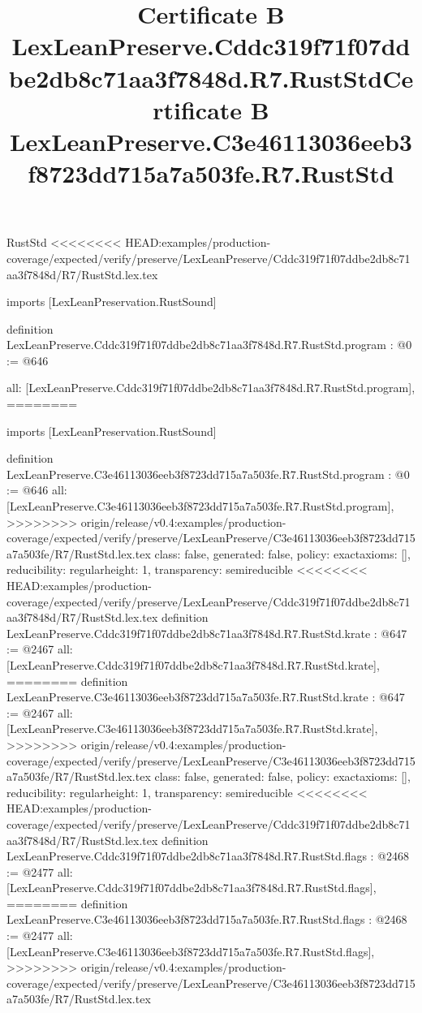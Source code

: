 \begin{lexlean}{RustStd}
<<<<<<<< HEAD:examples/production-coverage/expected/verify/preserve/LexLeanPreserve/Cddc319f71f07ddbe2db8c71aa3f7848d/R7/RustStd.lex.tex
\title{Certificate B LexLeanPreserve.Cddc319f71f07ddbe2db8c71aa3f7848d.R7.RustStd}
\begin{coremodule}
imports [LexLeanPreservation.RustSound]

definition LexLeanPreserve.Cddc319f71f07ddbe2db8c71aa3f7848d.R7.RustStd.program : @0 := @646 {
  all: [LexLeanPreserve.Cddc319f71f07ddbe2db8c71aa3f7848d.R7.RustStd.program],
========
\title{Certificate B LexLeanPreserve.C3e46113036eeb3f8723dd715a7a503fe.R7.RustStd}
\begin{coremodule}
imports [LexLeanPreservation.RustSound]

definition LexLeanPreserve.C3e46113036eeb3f8723dd715a7a503fe.R7.RustStd.program : @0 := @646 {
  all: [LexLeanPreserve.C3e46113036eeb3f8723dd715a7a503fe.R7.RustStd.program],
>>>>>>>> origin/release/v0.4:examples/production-coverage/expected/verify/preserve/LexLeanPreserve/C3e46113036eeb3f8723dd715a7a503fe/R7/RustStd.lex.tex
  class: false,
  generated: false,
  policy: exact{axioms: []},
  reducibility: regular{height: 1},
  transparency: semireducible
}
<<<<<<<< HEAD:examples/production-coverage/expected/verify/preserve/LexLeanPreserve/Cddc319f71f07ddbe2db8c71aa3f7848d/R7/RustStd.lex.tex
definition LexLeanPreserve.Cddc319f71f07ddbe2db8c71aa3f7848d.R7.RustStd.krate : @647 := @2467 {
  all: [LexLeanPreserve.Cddc319f71f07ddbe2db8c71aa3f7848d.R7.RustStd.krate],
========
definition LexLeanPreserve.C3e46113036eeb3f8723dd715a7a503fe.R7.RustStd.krate : @647 := @2467 {
  all: [LexLeanPreserve.C3e46113036eeb3f8723dd715a7a503fe.R7.RustStd.krate],
>>>>>>>> origin/release/v0.4:examples/production-coverage/expected/verify/preserve/LexLeanPreserve/C3e46113036eeb3f8723dd715a7a503fe/R7/RustStd.lex.tex
  class: false,
  generated: false,
  policy: exact{axioms: []},
  reducibility: regular{height: 1},
  transparency: semireducible
}
<<<<<<<< HEAD:examples/production-coverage/expected/verify/preserve/LexLeanPreserve/Cddc319f71f07ddbe2db8c71aa3f7848d/R7/RustStd.lex.tex
definition LexLeanPreserve.Cddc319f71f07ddbe2db8c71aa3f7848d.R7.RustStd.flags : @2468 := @2477 {
  all: [LexLeanPreserve.Cddc319f71f07ddbe2db8c71aa3f7848d.R7.RustStd.flags],
========
definition LexLeanPreserve.C3e46113036eeb3f8723dd715a7a503fe.R7.RustStd.flags : @2468 := @2477 {
  all: [LexLeanPreserve.C3e46113036eeb3f8723dd715a7a503fe.R7.RustStd.flags],
>>>>>>>> origin/release/v0.4:examples/production-coverage/expected/verify/preserve/LexLeanPreserve/C3e46113036eeb3f8723dd715a7a503fe/R7/RustStd.lex.tex
}}}
\end{coremodule}}
\end{coremodule}
\end{lexlean}
